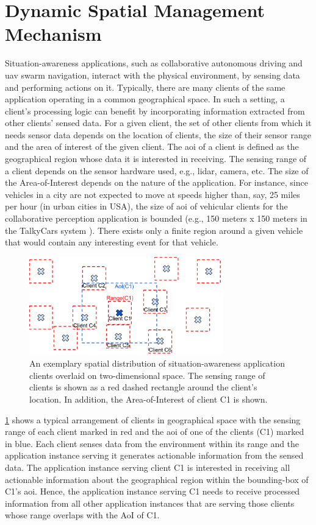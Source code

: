 \section{Dynamic Spatial Management Mechanism}
\label{sec:spatial_ctx_mgmt}

Situation-awareness applications, such as collaborative autonomous driving and \gls{uav} swarm navigation, interact with the physical environment, by sensing data and performing actions on it. Typically, there are many clients of the same application operating in a common geographical space. In such a setting, a client's processing logic can benefit by incorporating information extracted from other clients' sensed data. For a given client, the set of other clients from which it needs sensor data depends on the location of clients, the size of their sensor range and the area of interest of the given client. The \gls{aoi} of a client is defined as the geographical region whose data it is interested in receiving. The sensing range of a client depends on the sensor hardware used, e.g., \gls{lidar}, camera, etc. The size of the Area-of-Interest depends on the nature of the application. For instance, since vehicles in a city are not expected to move at speeds higher than, say, 25 miles per hour (in urban cities in USA), the size of \gls{aoi} of vehicular clients for the collaborative perception application is bounded (e.g., 150 meters x 150 meters in the TalkyCars system \cite{talkycars}). There exists only a finite region around a given vehicle that would contain any interesting event for that vehicle.
\begin{figure}
\centering
\includegraphics[width=0.75\textwidth]{figures/mechanisms/spatial_ctx_mgmt/aoi_range.pdf}
\caption{An exemplary spatial distribution of situation-awareness application clients overlaid on two-dimensional space. The sensing range of clients is shown as a red dashed rectangle around the client's location. In addition, the Area-of-Interest of client C1 is shown.}
\label{fig:aoi_range}
\end{figure}
\cref{fig:aoi_range} shows a typical arrangement of clients in geographical space with the sensing range of each client marked in red and the \gls{aoi} of one of the clients (C1) marked in blue. Each client senses data from the environment within its range and the application instance serving it generates actionable information from the sensed data. The application instance serving client C1 is interested in receiving all actionable information about the geographical region within the bounding-box of C1's \gls{aoi}. Hence, the application instance serving C1 needs to receive processed information from all other application instances that are serving those clients whose range overlaps with the AoI of C1. 

